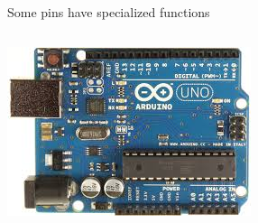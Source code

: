 \documentclass[compress]{beamer}
\begin{document}
\begin{frame}{Some pins have specialized functions}
    \begin{columns}
        \begin{column}{0.5\linewidth}
    \begin{center}
        \includegraphics[width=\linewidth]{arduino}
    \end{center}



\end{column}
\end{columns}
\end{frame}
\end{document}
